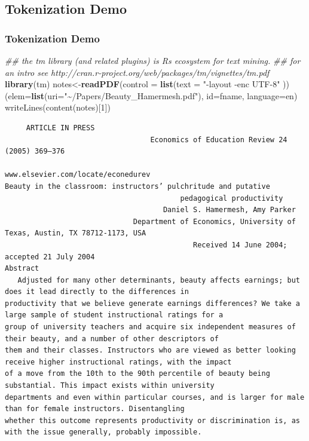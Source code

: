 \documentclass[
  shownotes,
  xcolor={svgnames},
  hyperref={colorlinks,citecolor=DarkBlue,linkcolor=DarkRed,urlcolor=DarkBlue}
  , aspectratio=169]{beamer}
\newenvironment{Shaded}{\begin{snugshade}}{\end{snugshade}}
\newcommand{\CommentTok}[1]{\textcolor[rgb]{0.56,0.35,0.01}{\textit{#1}}}
\newcommand{\DataTypeTok}[1]{\textcolor[rgb]{0.13,0.29,0.53}{#1}}
\newcommand{\KeywordTok}[1]{\textcolor[rgb]{0.13,0.29,0.53}{\textbf{#1}}}
\newcommand{\NormalTok}[1]{#1}
\newcommand{\StringTok}[1]{\textcolor[rgb]{0.31,0.60,0.02}{#1}}
\begin{document}
\subsection{Tokenization Demo}
\begin{frame}[fragile]
\frametitle{Tokenization Demo}

\begin{scriptsize}


\begin{Shaded}
\begin{Highlighting}[]
\CommentTok{\#\# the tm library (and related plugins) is R\textquotesingle{}s ecosystem for text mining.}
\CommentTok{\#\# for an intro see http://cran.r{-}project.org/web/packages/tm/vignettes/tm.pdf}
\KeywordTok{library}\NormalTok{(tm) }
\NormalTok{notes\textless{}{-}}\KeywordTok{readPDF}\NormalTok{(}\DataTypeTok{control =} \KeywordTok{list}\NormalTok{(}\DataTypeTok{text =} \StringTok{"{-}layout {-}enc UTF{-}8"}
  \NormalTok{))(}\DataTypeTok{elem=}\KeywordTok{list}\NormalTok{(}\DataTypeTok{uri=}\StringTok{"\textasciitilde{}/Papers/Beauty\_Hamermesh.pdf"}\NormalTok{), }\DataTypeTok{id=}\NormalTok{fname, }
  \DataTypeTok{language=}\StringTok{\textquotesingle{}en\textquotesingle{}}\NormalTok{)}
writeLines(content(notes)[1]) 
\end{Highlighting}
\end{Shaded}
\end{scriptsize}
\begin{tiny}



\begin{verbatim}
     ARTICLE IN PRESS
                                  Economics of Education Review 24 (2005) 369–376
                                                                                               www.elsevier.com/locate/econedurev
Beauty in the classroom: instructors’ pulchritude and putative
                                         pedagogical productivity
                                     Daniel S. Hamermesh, Amy Parker
                              Department of Economics, University of Texas, Austin, TX 78712-1173, USA
                                            Received 14 June 2004; accepted 21 July 2004
Abstract
   Adjusted for many other determinants, beauty affects earnings; but does it lead directly to the differences in
productivity that we believe generate earnings differences? We take a large sample of student instructional ratings for a
group of university teachers and acquire six independent measures of their beauty, and a number of other descriptors of
them and their classes. Instructors who are viewed as better looking receive higher instructional ratings, with the impact
of a move from the 10th to the 90th percentile of beauty being substantial. This impact exists within university
departments and even within particular courses, and is larger for male than for female instructors. Disentangling
whether this outcome represents productivity or discrimination is, as with the issue generally, probably impossible.
\end{verbatim}
\end{tiny}
\end{frame}
\end{document}
